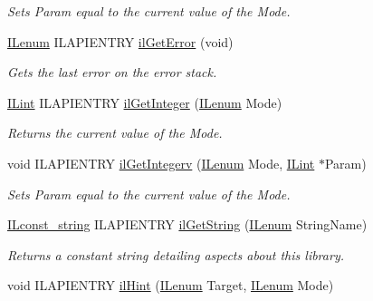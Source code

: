 \begin{DoxyCompactItemize}
\begin{DoxyCompactList}\small\item\em Sets {\itshape Param} equal to the current value of the {\itshape Mode}. \end{DoxyCompactList}\item 
\hyperlink{group__il__types_ga62ca73445716183ef42b1f3906a45ed0}{I\+Lenum} I\+L\+A\+P\+I\+E\+N\+T\+R\+Y \hyperlink{group__state_ga6a4486f21a6ee2812033aeda6c4b320e}{il\+Get\+Error} (void)
\begin{DoxyCompactList}\small\item\em Gets the last error on the error stack. \end{DoxyCompactList}\item 
\hyperlink{group__il__types_ga8effe51a00daaa0878631e5af75a36cb}{I\+Lint} I\+L\+A\+P\+I\+E\+N\+T\+R\+Y \hyperlink{group__state_gac4d450b2397f016bbe00b0a0e4b53a0c}{il\+Get\+Integer} (\hyperlink{group__il__types_ga62ca73445716183ef42b1f3906a45ed0}{I\+Lenum} Mode)
\begin{DoxyCompactList}\small\item\em Returns the current value of the {\itshape Mode}. \end{DoxyCompactList}\item 
void I\+L\+A\+P\+I\+E\+N\+T\+R\+Y \hyperlink{group__state_ga4ed72709140871f480987a8c043ca4b8}{il\+Get\+Integerv} (\hyperlink{group__il__types_ga62ca73445716183ef42b1f3906a45ed0}{I\+Lenum} Mode, \hyperlink{group__il__types_ga8effe51a00daaa0878631e5af75a36cb}{I\+Lint} $\ast$Param)
\begin{DoxyCompactList}\small\item\em Sets {\itshape Param} equal to the current value of the {\itshape Mode}. \end{DoxyCompactList}\item 
\hyperlink{group__il__types_ga1aa1edc3eb344e14acacb02bade24a5a}{I\+Lconst\+\_\+string} I\+L\+A\+P\+I\+E\+N\+T\+R\+Y \hyperlink{group__state_ga29fd50e44b7e69435d64f82613438e4f}{il\+Get\+String} (\hyperlink{group__il__types_ga62ca73445716183ef42b1f3906a45ed0}{I\+Lenum} String\+Name)
\begin{DoxyCompactList}\small\item\em Returns a constant string detailing aspects about this library. \end{DoxyCompactList}\item 
void I\+L\+A\+P\+I\+E\+N\+T\+R\+Y \hyperlink{group__state_gad6f73e9f63ca905c29637f07e54cc604}{il\+Hint} (\hyperlink{group__il__types_ga62ca73445716183ef42b1f3906a45ed0}{I\+Lenum} Target, \hyperlink{group__il__types_ga62ca73445716183ef42b1f3906a45ed0}{I\+Lenum} Mode)

\end{DoxyCompactItemize}
